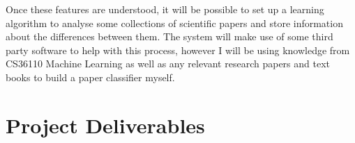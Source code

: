 \documentclass[12pt,a4paper]{article}
\begin{document}
Once these features are understood, it will be possible to set up a learning
algorithm to analyse some collections of scientific papers and store
information about the differences between them. The system will make use of
some third party software to help with this process, however I will be using
knowledge from CS36110 Machine Learning as well as any relevant research papers
and text books to build a paper classifier myself.


\section{Project Deliverables}


\nocite{*}

\end{document}
